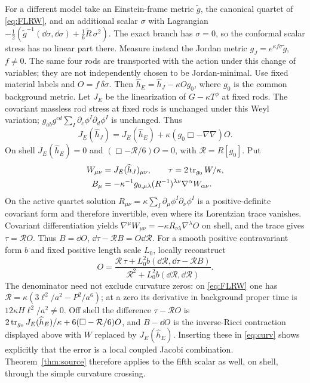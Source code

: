 For a different model take an Einstein-frame metric \(\widetilde g\), the canonical quartet of \eqref{eq:FLRW}, and an additional scalar \(\sigma\) with Lagrangian
\(-\tfrac12(\widetilde g^{-1}(\dd\sigma,\dd\sigma)+\tfrac16\widetilde R\,\sigma^2)\).
The exact branch has \(\sigma=0\), so the conformal scalar stress has no linear part there. Measure instead the Jordan metric \(g_J=e^{\kappa f\sigma}\widetilde g\), \(f\ne0\). The same four rods are transported with the action under this change of variables; they are not independently chosen to be Jordan-minimal. Use fixed material labels and \(O=f\,\delta\sigma\). Then \(\widehat h_E=\widehat h_J-\kappa O g_0\), where \(g_0\) is the common background metric. Let \(J_E\) be the linearization of \(G-\kappa T^\phi\) at fixed rods. The covariant massless rod stress at fixed rods is unchanged under this Weyl variation; \(g_{ab}g^{cd}\sum_I\partial_c\phi^I\partial_d\phi^I\) is unchanged. Thus
\[
 J_E(\widehat h_J)=J_E(\widehat h_E)
                     +\kappa(g_0\Box-\nabla\nabla)O.
\]
On shell \(J_E(\widehat h_E)=0\) and \((\Box-\mathcal R/6)O=0\), with \(\mathcal R=R[g_0]\). Put
\[
 \begin{split}
 W_{\mu\nu}&=J_E(\widehat h_J)_{\mu\nu},\qquad
 \tau=2\operatorname{tr}_{g_0} W/\kappa,\\
 B_\mu&=-\kappa^{-1}g_{0,\mu\lambda}(R^{-1})^{\lambda\nu}
                                      \nabla^\alpha W_{\alpha\nu}.
 \end{split}
\]
On the active quartet solution \(R_{\mu\nu}=\kappa\sum_I\partial_\mu\phi^I\partial_\nu\phi^I\) is a positive-definite covariant form and therefore invertible, even where its Lorentzian trace vanishes. Covariant differentiation yields \(\nabla^\mu W_{\mu\nu}=-\kappa R_{\nu\lambda}\nabla^\lambda O\) on shell, and the trace gives \(\tau=\mathcal R O\). Thus \(B=\dd O\), \(\dd\tau-\mathcal RB=O\dd\mathcal R\). For a smooth positive contravariant form \(b\) and fixed positive length scale \(L_0\), locally reconstruct
\begin{equation}\label{eq:curv}
 O=\frac{\mathcal R\,\tau+
      L_0^2 b(\dd\mathcal R,\dd\tau-\mathcal RB)}
          {\mathcal R^2+L_0^2 b(\dd\mathcal R,\dd\mathcal R)} .
\end{equation}
The denominator need not exclude curvature zeros: on \eqref{eq:FLRW} one has
\(\mathcal R=\kappa(3\ell^2/a^2-P^2/a^6)\);
at a zero its derivative in background proper time is \(12\kappa H\ell^2/a^2\ne0\). Off shell the difference \(\tau-\mathcal R O\) is
\(2\operatorname{tr}_{g_0}J_E(\widehat h_E)/\kappa+6(\Box-\mathcal R/6)O\), and \(B-\dd O\) is the inverse-Ricci contraction displayed above with \(W\) replaced by \(J_E(\widehat h_E)\). Inserting these in \eqref{eq:curv} shows explicitly that the error is a local coupled Jacobi combination. Theorem~\ref{thm:source} therefore applies to the fifth scalar as well, on shell, through the simple curvature crossing.

